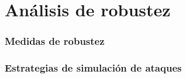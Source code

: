 \section{Análisis de robustez}

\subsubsection{Medidas de robustez}


\subsubsection{Estrategias de simulación de ataques}